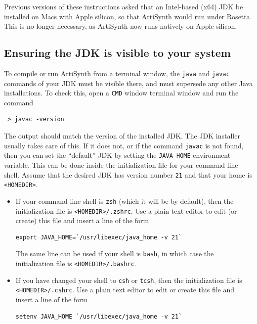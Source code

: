 \ifMacOS
\begin{sideblock}
Previous versions of these instructions asked that an Intel-based
({\sf x64}) JDK be installed on Macs with Apple silicon, so that
ArtiSynth would run under Rosetta. This is no longer necessary, as
ArtiSynth now runs natively on Apple silicon.
\end{sideblock}
\fi

\subsection{Ensuring the JDK is visible to your system}
\label{MakingJDKVisible}

To compile or run ArtiSynth from a terminal window, the {\tt java} and
{\tt javac} commands of your JDK must be visible there, and must
supersede any other Java installations. To check this, open a
\ifWindows
{\tt CMD} window
\else
terminal window
\fi
and run the command 
\begin{verbatim}
 > javac -version
\end{verbatim}
The output should match the version of the installed JDK.
\ifWindows
The JDK installer usually takes care of this.
\fi
If it does not, or if the command {\tt javac} is not found,
\ifMacOS %
then you can set the ``default'' JDK by setting the {\tt JAVA\_HOME}
environment variable.  This can be done inside the
initialization file for your command line shell.
Assume that the desired JDK has version number {\tt 21} and
that your home \directory{} is {\tt <HOMEDIR>}. 

\begin{itemize}

\item If your command line shell is {\tt zsh} (which it will be by
default), then the initialization file is {\tt <HOMEDIR>/.zshrc}. Use a
plain text editor to edit (or create) this file and insert a line of
the form
%
\begin{lstlisting}[]
  export JAVA_HOME=`/usr/libexec/java_home -v 21`
\end{lstlisting}
%
The same line can be used if your shell is {\tt bash}, in which case
the initialization file is {\tt <HOMEDIR>/.bashrc}.

\item If you have changed your shell to {\tt csh} or {\tt tcsh},
then the initialization file is {\tt <HOMEDIR>/.cshrc}. Use a plain text editor
to edit or create this file and insert a line of the form
%
\begin{lstlisting}[]
  setenv JAVA_HOME `/usr/libexec/java_home -v 21`
\end{lstlisting}
%

\end{itemize}

